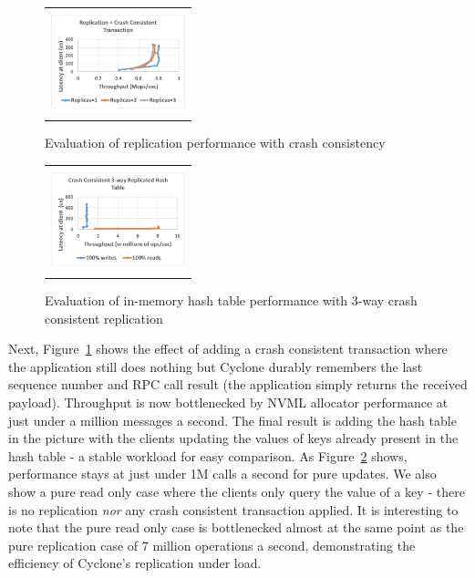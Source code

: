 \documentclass[letterpaper,twocolumn,10pt]{article}
\begin{document}
\begin{figure}[htb]
\centering
\begin{tabular}{c}
\includegraphics[height=3cm,width=0.8\columnwidth]{results/cc_mops.pdf}
\end{tabular}
\vspace{-0.22in}
\caption{Evaluation of replication performance with crash consistency}
\label{fig:cc_rep}
\vspace{-0.08in}
\end{figure}

\begin{figure}[htb]
\centering
\begin{tabular}{c}
\includegraphics[height=3cm,width=0.8\columnwidth]{results/app_mops.pdf}
\end{tabular}
\vspace{-0.22in}
\caption{Evaluation of in-memory hash table performance with 3-way crash consistent replication}
\label{fig:app_rep}
\vspace{-0.08in}
\end{figure}

Next, Figure~\ref{fig:cc_rep} shows the effect of adding a crash consistent
transaction where the application still does nothing but Cyclone durably
remembers the last sequence number and RPC call result (the application simply
returns the received payload). Throughput is now bottlenecked by NVML allocator
performance at just under a million messages a second. The final result is
adding the hash table in the picture with the clients updating the values of
keys already present in the hash table - a stable workload for easy
comparison. As Figure~\ref{fig:app_rep} shows, performance stays at just under
1M calls a second for pure updates. We also show a pure read only case where the
clients only query the value of a key - there is no replication \emph{nor} any
crash consistent transaction applied. It is interesting to note that the pure
read only case is bottlenecked almost at the same point as the pure replication
case of 7 million operations a second, demonstrating the efficiency of Cyclone's
replication under load.
\end{document}

